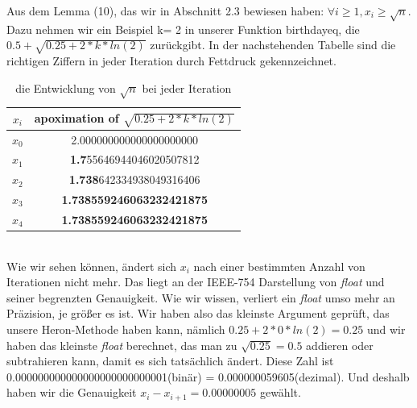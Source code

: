 \documentclass[course=erap]{aspdoc}
\begin{document}
Aus dem Lemma (10), das wir in Abschnitt 2.3 bewiesen haben: $ \forall i\geq1 , x_{i}\geq\sqrt{n}$.
Dazu nehmen wir ein Beispiel k= 2 in unserer Funktion birthdayeq, die $0.5+\sqrt{0.25+2*k*ln(2)}$ zurückgibt. In der nachstehenden Tabelle sind die richtigen Ziffern in jeder Iteration durch Fettdruck gekennzeichnet.
\begin{table}[h!]
    \centering
    \begin{tabular}{c|c}
        \textbf{$x_{i}$} & \textbf{apoximation of $\sqrt{0.25+2*k*ln(2)}$} \\
        \hline
        $x_0$            & 2.000000000000000000000                         \\
        $x_1$            & \textbf{1.7}55646944046020507812                \\
        $x_2$            & \textbf{1.738}642334938049316406                \\
        $x_3$            & \textbf{1.738559246063232421875}                \\
        $x_4$            & \textbf{1.738559246063232421875}                \\
    \end{tabular}
    \caption{die Entwicklung von $\sqrt{n}$ bei jeder Iteration}
    \label{tab:my_label}
\end{table} \\
Wie wir sehen können, ändert sich $x_i$ nach einer bestimmten Anzahl von Iterationen nicht mehr. Das liegt an der IEEE-754 Darstellung von \textit{float} und seiner begrenzten Genauigkeit. Wie wir wissen, verliert ein \textit{float} umso mehr an Präzision, je größer es ist. Wir haben also das kleinste Argument geprüft, das unsere Heron-Methode haben kann, nämlich $0.25+2*0*ln(2)=0.25$ und wir haben das kleinste \textit{float} berechnet, das man zu $\sqrt{0.25}=0.5$ addieren oder subtrahieren kann, damit es sich tatsächlich ändert. Diese Zahl ist 0.000000000000000000000000001(binär) = 0.000000059605(dezimal).
Und deshalb haben wir die Genauigkeit $x_i-x_{i+1}= 0.00000005$ gewählt.
\end{document}

